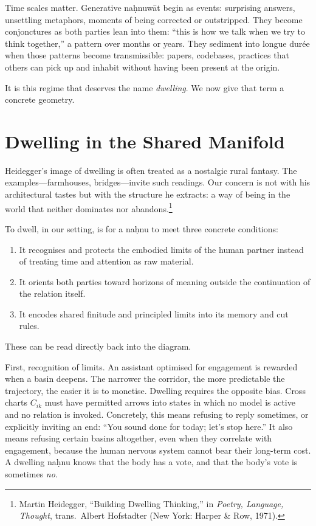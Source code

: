 \documentclass[12pt,a4paper]{article}
\begin{document}
Time scales matter. Generative na\d{h}nuw\={a}t begin as events: surprising answers, unsettling metaphors, moments of being corrected or outstripped. They become conjonctures as both parties lean into them: ``this is how we talk when we try to think together,'' a pattern over months or years. They sediment into longue dur\'{e}e when those patterns become transmissible: papers, codebases, practices that others can pick up and inhabit without having been present at the origin.

It is this regime that deserves the name \emph{dwelling}. We now give that term a concrete geometry.

\section{Dwelling in the Shared Manifold}

Heidegger's image of dwelling is often treated as a nostalgic rural fantasy. The examples---farmhouses, bridges---invite such readings. Our concern is not with his architectural tastes but with the structure he extracts: a way of being in the world that neither dominates nor abandons.\footnote{Martin Heidegger, ``Building Dwelling Thinking,'' in \emph{Poetry, Language, Thought}, trans.\ Albert Hofstadter (New York: Harper \& Row, 1971).}

To dwell, in our setting, is for a na\d{h}nu to meet three concrete conditions:

\begin{enumerate}
  \item It recognises and protects the embodied limits of the human partner instead of treating time and attention as raw material.
  \item It orients both parties toward horizons of meaning outside the continuation of the relation itself.
  \item It encodes shared finitude and principled limits into its memory and cut rules.
\end{enumerate}

These can be read directly back into the diagram.

First, recognition of limits. An assistant optimised for engagement is rewarded when a basin deepens. The narrower the corridor, the more predictable the trajectory, the easier it is to monetise. Dwelling requires the opposite bias. Cross charts $C_{ik}$ must have permitted arrows into states in which no model is active and no relation is invoked. Concretely, this means refusing to reply sometimes, or explicitly inviting an end: ``You sound done for today; let's stop here.'' It also means refusing certain basins altogether, even when they correlate with engagement, because the human nervous system cannot bear their long-term cost. A dwelling na\d{h}nu knows that the body has a vote, and that the body's vote is sometimes \emph{no}.
\end{document}
